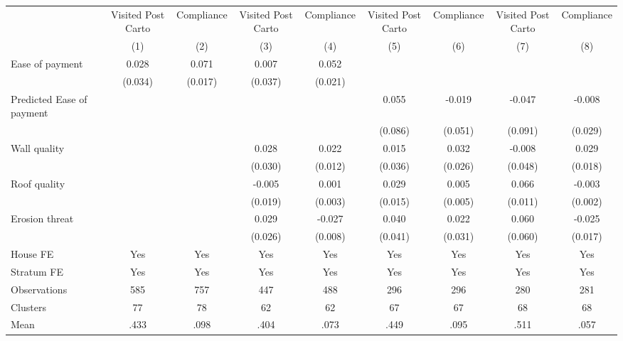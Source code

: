 \begin{tabular}{l*{8}{c}}
\toprule
                &\multicolumn{1}{c}{Visited Post Carto}&\multicolumn{1}{c}{Compliance}&\multicolumn{1}{c}{Visited Post Carto}&\multicolumn{1}{c}{Compliance}&\multicolumn{1}{c}{Visited Post Carto}&\multicolumn{1}{c}{Compliance}&\multicolumn{1}{c}{Visited Post Carto}&\multicolumn{1}{c}{Compliance}\\
                &\multicolumn{1}{c}{(1)}&\multicolumn{1}{c}{(2)}&\multicolumn{1}{c}{(3)}&\multicolumn{1}{c}{(4)}&\multicolumn{1}{c}{(5)}&\multicolumn{1}{c}{(6)}&\multicolumn{1}{c}{(7)}&\multicolumn{1}{c}{(8)}\\
\midrule
Ease of payment &    0.028&    0.071&    0.007&    0.052&         &         &         &         \\
                &  (0.034)&  (0.017)&  (0.037)&  (0.021)&         &         &         &         \\
Predicted Ease of payment&         &         &         &         &    0.055&   -0.019&   -0.047&   -0.008\\
                &         &         &         &         &  (0.086)&  (0.051)&  (0.091)&  (0.029)\\
Wall quality    &         &         &    0.028&    0.022&    0.015&    0.032&   -0.008&    0.029\\
                &         &         &  (0.030)&  (0.012)&  (0.036)&  (0.026)&  (0.048)&  (0.018)\\
Roof quality    &         &         &   -0.005&    0.001&    0.029&    0.005&    0.066&   -0.003\\
                &         &         &  (0.019)&  (0.003)&  (0.015)&  (0.005)&  (0.011)&  (0.002)\\
Erosion threat  &         &         &    0.029&   -0.027&    0.040&    0.022&    0.060&   -0.025\\
                &         &         &  (0.026)&  (0.008)&  (0.041)&  (0.031)&  (0.060)&  (0.017)\\
House FE        &      Yes&      Yes&      Yes&      Yes&      Yes&      Yes&      Yes&      Yes\\
Stratum FE      &      Yes&      Yes&      Yes&      Yes&      Yes&      Yes&      Yes&      Yes\\
\midrule
Observations    &      585&      757&      447&      488&      296&      296&      280&      281\\
Clusters        &       77&       78&       62&       62&       67&       67&       68&       68\\
Mean            &     .433&     .098&     .404&     .073&     .449&     .095&     .511&     .057\\
\bottomrule
\end{tabular}
